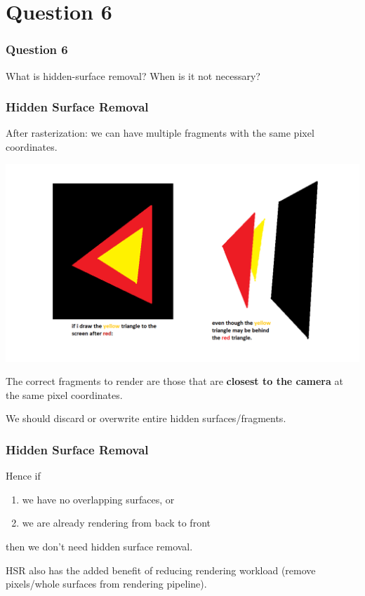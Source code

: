 \documentclass{beamer}
\begin{document}
\section{Question 6}

\begin{frame}
    \frametitle{Question 6}
    What is hidden-surface removal? When is it not necessary?
\end{frame}

\begin{frame}
    \frametitle{Hidden Surface Removal}

    After rasterization: we can have multiple fragments with the same pixel coordinates.

    \begin{center}
        \includegraphics[scale=0.25]{q6-hsr.png}
    \end{center}

    The correct fragments to render are those that are \textbf{closest to the camera} 
    at the same pixel coordinates. 
    
    We should discard or overwrite entire hidden surfaces/fragments.

\end{frame}

\begin{frame}
    \frametitle{Hidden Surface Removal}

    Hence if
    \begin{enumerate}
        \item we have no overlapping surfaces, or
        \item we are already rendering from back to front
    \end{enumerate}
    then we don't need hidden surface removal.

    \begin{tcolorbox}
        HSR also has the added benefit of reducing rendering workload 
        (remove pixels/whole surfaces from rendering pipeline).
    \end{tcolorbox}

\end{frame}
\end{document}
